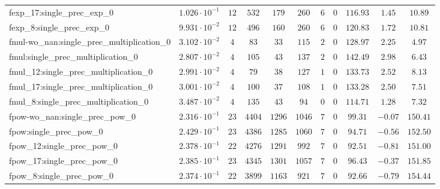 \begin{tabular}{|l|c|c|c|c|c|c|c|c|c|c|}
fexp\_17:single\_prec\_exp\_0                  & $ 1.026 \cdot 10^{-1} $ & $ 12     $ & $ 532    $ & $ 179   $ & $ 260   $ & $ 6   $ & $ 0 $ & $ 116.93      $ & $ 1.45    $ & $ 10.89   $ \\
fexp\_8:single\_prec\_exp\_0                   & $ 9.931 \cdot 10^{-2} $ & $ 12     $ & $ 496    $ & $ 160   $ & $ 260   $ & $ 6   $ & $ 0 $ & $ 120.83      $ & $ 1.72    $ & $ 10.81   $ \\
fmul-wo\_nan:single\_prec\_multiplication\_0   & $ 3.102 \cdot 10^{-2} $ & $ 4      $ & $ 83     $ & $ 33    $ & $ 115   $ & $ 2   $ & $ 0 $ & $ 128.97      $ & $ 2.25    $ & $ 4.97    $ \\
fmul:single\_prec\_multiplication\_0           & $ 2.807 \cdot 10^{-2} $ & $ 4      $ & $ 105    $ & $ 43    $ & $ 137   $ & $ 2   $ & $ 0 $ & $ 142.49      $ & $ 2.98    $ & $ 6.43    $ \\
fmul\_12:single\_prec\_multiplication\_0       & $ 2.991 \cdot 10^{-2} $ & $ 4      $ & $ 79     $ & $ 38    $ & $ 127   $ & $ 1   $ & $ 0 $ & $ 133.73      $ & $ 2.52    $ & $ 8.13    $ \\
fmul\_17:single\_prec\_multiplication\_0       & $ 3.001 \cdot 10^{-2} $ & $ 4      $ & $ 100    $ & $ 37    $ & $ 108   $ & $ 1   $ & $ 0 $ & $ 133.28      $ & $ 2.50    $ & $ 7.51    $ \\
fmul\_8:single\_prec\_multiplication\_0        & $ 3.487 \cdot 10^{-2} $ & $ 4      $ & $ 135    $ & $ 43    $ & $ 94    $ & $ 0   $ & $ 0 $ & $ 114.71      $ & $ 1.28    $ & $ 7.32    $ \\
fpow-wo\_nan:single\_prec\_pow\_0              & $ 2.316 \cdot 10^{-1} $ & $ 23     $ & $ 4404   $ & $ 1296  $ & $ 1046  $ & $ 7   $ & $ 0 $ & $ 99.31       $ & $ -0.07   $ & $ 150.41  $ \\
fpow:single\_prec\_pow\_0                      & $ 2.429 \cdot 10^{-1} $ & $ 23     $ & $ 4386   $ & $ 1285  $ & $ 1060  $ & $ 7   $ & $ 0 $ & $ 94.71       $ & $ -0.56   $ & $ 152.50  $ \\
fpow\_12:single\_prec\_pow\_0                  & $ 2.378 \cdot 10^{-1} $ & $ 22     $ & $ 4276   $ & $ 1291  $ & $ 992   $ & $ 7   $ & $ 0 $ & $ 92.51       $ & $ -0.81   $ & $ 151.00  $ \\
fpow\_17:single\_prec\_pow\_0                  & $ 2.385 \cdot 10^{-1} $ & $ 23     $ & $ 4345   $ & $ 1301  $ & $ 1057  $ & $ 7   $ & $ 0 $ & $ 96.43       $ & $ -0.37   $ & $ 151.85  $ \\
fpow\_8:single\_prec\_pow\_0                   & $ 2.374 \cdot 10^{-1} $ & $ 22     $ & $ 3899   $ & $ 1163  $ & $ 921   $ & $ 7   $ & $ 0 $ & $ 92.66       $ & $ -0.79   $ & $ 154.44  $ \\

\end{tabular}
